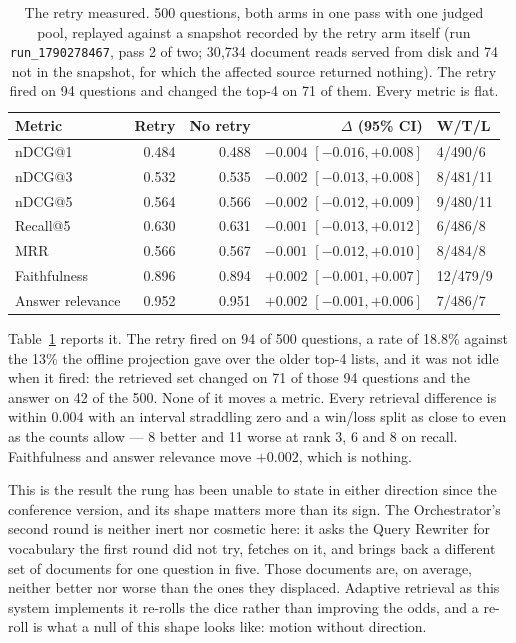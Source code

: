 \documentclass[acmsmall,review,anonymous,screen]{acmart}
\begin{document}
\begin{table}[t]
\caption{The retry measured. 500 questions, both arms in one pass with one
judged pool, replayed against a snapshot recorded by the retry arm itself
(run \texttt{run\_1790278467}, pass 2 of two; 30{,}734 document reads served
from disk and 74 not in the snapshot, for which the affected source returned
nothing). The retry fired on 94 questions and changed the top-4 on 71 of them.
Every metric is flat.}
\label{tab:retry}
\begin{tabular}{lrrrl}
\toprule
Metric & Retry & No retry & $\Delta$ (95\% CI) & W/T/L \\
\midrule
nDCG@1   & 0.484 & 0.488 & $-0.004$ $[-0.016, +0.008]$ & 4/490/6 \\
nDCG@3   & 0.532 & 0.535 & $-0.002$ $[-0.013, +0.008]$ & 8/481/11 \\
nDCG@5   & 0.564 & 0.566 & $-0.002$ $[-0.012, +0.009]$ & 9/480/11 \\
Recall@5 & 0.630 & 0.631 & $-0.001$ $[-0.013, +0.012]$ & 6/486/8 \\
MRR      & 0.566 & 0.567 & $-0.001$ $[-0.012, +0.010]$ & 8/484/8 \\
\midrule
Faithfulness     & 0.896 & 0.894 & $+0.002$ $[-0.001, +0.007]$ & 12/479/9 \\
Answer relevance & 0.952 & 0.951 & $+0.002$ $[-0.001, +0.006]$ & 7/486/7 \\
\bottomrule
\end{tabular}
\end{table}

Table~\ref{tab:retry} reports it. The retry fired on 94 of 500 questions, a
rate of 18.8\% against the 13\% the offline projection gave over the older
top-4 lists, and it was not idle when it fired: the retrieved set changed on 71
of those 94 questions and the answer on 42 of the 500. None of it moves a
metric. Every retrieval difference is within $0.004$ with an interval
straddling zero and a win/loss split as close to even as the counts allow ---
8 better and 11 worse at rank 3, 6 and 8 on recall. Faithfulness and answer
relevance move $+0.002$, which is nothing.

This is the result the rung has been unable to state in either direction since
the conference version, and its shape matters more than its sign. The
Orchestrator's second round is neither inert nor cosmetic here: it asks the
Query Rewriter for vocabulary the first round did not try, fetches on it, and
brings back a different set of documents for one question in five. Those
documents are, on average, neither better nor worse than the ones they
displaced. Adaptive retrieval as this system implements it re-rolls the dice
rather than improving the odds, and a re-roll is what a null of this shape
looks like: motion without direction.
\end{document}

